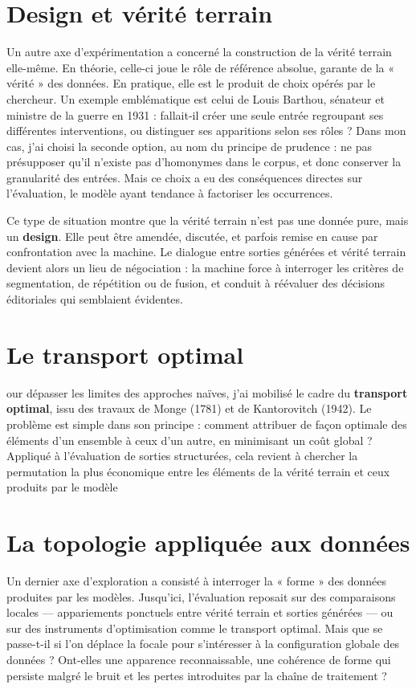 \section{Design et vérité terrain}

Un autre axe d’expérimentation a concerné la construction de la vérité terrain elle-même. En théorie, celle-ci joue le rôle de référence absolue, garante de la « vérité » des données. En pratique, elle est le produit de choix opérés par le chercheur. Un exemple emblématique est celui de Louis Barthou, sénateur et ministre de la guerre en 1931 : fallait-il créer une seule entrée regroupant ses différentes interventions, ou distinguer ses apparitions selon ses rôles ? Dans mon cas, j’ai choisi la seconde option, au nom du principe de prudence : ne pas présupposer qu’il n’existe pas d’homonymes dans le corpus, et donc conserver la granularité des entrées. Mais ce choix a eu des conséquences directes sur l’évaluation, le modèle ayant tendance à factoriser les occurrences.

Ce type de situation montre que la vérité terrain n’est pas une donnée pure, mais un \textbf{design}. Elle peut être amendée, discutée, et parfois remise en cause par confrontation avec la machine. Le dialogue entre sorties générées et vérité terrain devient alors un lieu de négociation : la machine force à interroger les critères de segmentation, de répétition ou de fusion, et conduit à réévaluer des décisions éditoriales qui semblaient évidentes.

\section{Le transport optimal}

our dépasser les limites des approches naïves, j’ai mobilisé le cadre du \textbf{transport optimal}, issu des travaux de Monge (1781) et de Kantorovitch (1942). Le problème est simple dans son principe : comment attribuer de façon optimale des éléments d’un ensemble à ceux d’un autre, en minimisant un coût global ? Appliqué à l’évaluation de sorties structurées, cela revient à chercher la permutation la plus économique entre les éléments de la vérité terrain et ceux produits par le modèle

\section{La topologie appliquée aux données}

Un dernier axe d’exploration a consisté à interroger la « forme » des données produites par les modèles. Jusqu’ici, l’évaluation reposait sur des comparaisons locales — appariements ponctuels entre vérité terrain et sorties générées — ou sur des instruments d’optimisation comme le transport optimal. Mais que se passe-t-il si l’on déplace la focale pour s’intéresser à la configuration globale des données ? Ont-elles une apparence reconnaissable, une cohérence de forme qui persiste malgré le bruit et les pertes introduites par la chaîne de traitement ?

